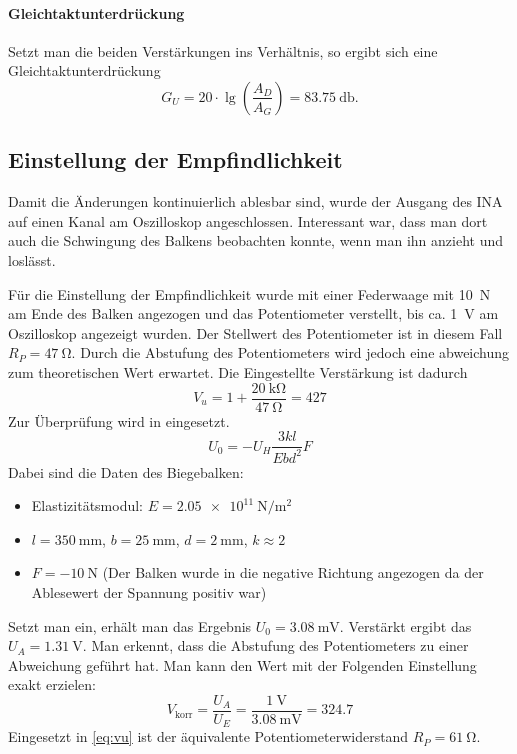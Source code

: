 \paragraph{Gleichtaktunterdrückung} Setzt man die beiden Verstärkungen ins Verhältnis, so ergibt sich eine Gleichtaktunterdrückung
\[
	G_U = 20 \cdot \lg\left(\frac{A_D}{A_G}\right) = \SI{83.75}{\decibel}.
\]

\subsection{Einstellung der Empfindlichkeit}

Damit die Änderungen kontinuierlich ablesbar sind, wurde der Ausgang des INA auf einen Kanal am Oszilloskop angeschlossen. Interessant war, dass man dort auch die Schwingung des Balkens beobachten konnte, wenn man ihn anzieht und loslässt.

Für die Einstellung der Empfindlichkeit wurde mit einer Federwaage mit \SI{10}{\newton} am Ende des Balken angezogen und das Potentiometer verstellt, bis ca. \SI{1}{\volt} am Oszilloskop angezeigt wurden. Der Stellwert des Potentiometer ist in diesem Fall $R_P=\SI{47}{\ohm}$. Durch die Abstufung des Potentiometers wird jedoch eine abweichung zum theoretischen Wert erwartet. Die Eingestellte Verstärkung ist dadurch
\[
	V_u = 1 + \frac{\SI{20}{\kilo\ohm}}{\SI{47}{\ohm}} = 427
\]
Zur Überprüfung wird in \cite[S.~92, Gl.~4.32]{EMTPraktikum2025} eingesetzt.
\[
U_0 = -U_H \frac{3kl}{Ebd^{2}}F
\]
Dabei sind die Daten des Biegebalken:
\begin{itemize}[noitemsep]
	\item Elastizitätsmodul: $E = \SI{2.05e11}{\newton\per\meter\squared}$
	\item $l = \SI{350}{\milli\meter}$, $b = \SI{25}{\milli\meter}$, $d = \SI{2} {\milli\meter}$, $k \approx 2$
	\item $F = -\SI{10}{\newton}$ (Der Balken wurde in die negative Richtung angezogen da der Ablesewert der Spannung positiv war)
\end{itemize}

Setzt man ein, erhält man das Ergebnis $U_0 = \SI{3.08}{\milli\volt}$. Verstärkt ergibt das $U_A = \SI{1.31}{\volt}$. Man erkennt, dass die Abstufung des Potentiometers zu einer Abweichung geführt hat. Man kann den Wert mit der Folgenden Einstellung exakt erzielen:
\[
V_{\mathrm{korr}}=\frac{U_A}{U_E} = \frac{\SI{1}{\volt}}{\SI{3.08}{\milli\volt}} = 324.7
\]
Eingesetzt in \autoref{eq:vu} ist der äquivalente Potentiometerwiderstand $R_P=\SI{61}{\ohm}$.

